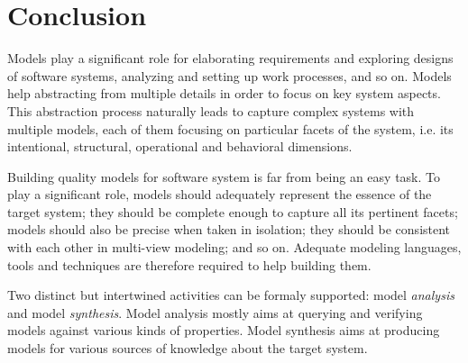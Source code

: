 \chapter{Conclusion\label{chapter:conclusion}}

Models play a significant role for elaborating requirements and exploring designs of software systems, analyzing and setting up work processes, and so on. Models help abstracting from multiple details in order to focus on key system aspects. This abstraction process naturally leads to capture complex systems with multiple models, each of them focusing on particular facets of the system, i.e. its intentional, structural, operational and behavioral dimensions.

Building quality models for software system is far from being an easy task. To play a significant role, models should adequately represent the essence of the target system; they should be complete enough to capture all its pertinent facets; models should also be precise when taken in isolation; they should be consistent with each other in multi-view modeling; and so on. Adequate modeling languages, tools and techniques are therefore required to help building them.

Two distinct but intertwined activities can be formaly supported: model \emph{analysis} and model \emph{synthesis}. Model analysis mostly aims at querying and verifying models against various kinds of properties. Model synthesis aims at producing models for various sources of knowledge about the target system. 

